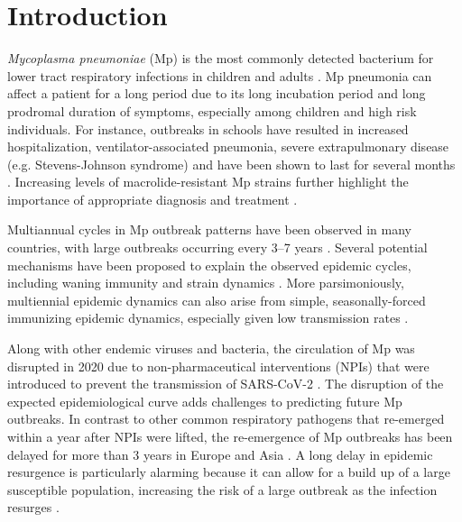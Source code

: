 \documentclass[12pt]{article}
\begin{document}
\pagebreak

\section{Introduction}

\textit{Mycoplasma pneumoniae} (Mp) is the most commonly detected bacterium for lower tract respiratory infections in children and adults \citep{waites2004mycoplasma,jain2015community,jain2015community2,bajantri2018mycoplasma}.
Mp pneumonia can affect a patient for a long period due to its long incubation period and long prodromal duration of symptoms, especially among children and high risk individuals.
For instance, outbreaks in schools have resulted in increased hospitalization, ventilator-associated pneumonia, severe extrapulmonary disease (e.g. Stevens-Johnson syndrome) and have been shown to last for several months \citep{walter2008community,olson2015outbreak}.
Increasing levels of macrolide-resistant Mp strains further highlight the importance of appropriate diagnosis and treatment \citep{pereyre2016mycoplasma}.

Multiannual cycles in Mp outbreak patterns have been observed in many countries, with large outbreaks occurring every 3--7 years \citep{kim2009mycoplasma,brown2016mycoplasma}.
Several potential mechanisms have been proposed to explain the observed epidemic cycles, including waning immunity \citep{omori2015determinant} and strain dynamics \citep{kenri2008genotyping,zhang2019positively}.
More parsimoniously, multiennial epidemic dynamics can also arise from simple, seasonally-forced immunizing epidemic dynamics, especially given low transmission rates \citep{earn2000simple,keeling2001seasonally}.

Along with other endemic viruses and bacteria, the circulation of Mp was disrupted in 2020 due to non-pharmaceutical interventions (NPIs) that were introduced to prevent the transmission of SARS-CoV-2 \citep{boyanton2024sars}.
The disruption of the expected epidemiological curve adds challenges to predicting future Mp outbreaks.
In contrast to other common respiratory pathogens that re-emerged within a year after NPIs were lifted, the re-emergence of Mp outbreaks has been delayed for more than 3 years in Europe and Asia \citep{sauteur2024mycoplasma}.
A long delay in epidemic resurgence is particularly alarming because it can allow for a build up of a large susceptible population, increasing the risk of a large outbreak as the infection resurges \citep{baker2020impact}.
\end{document}
